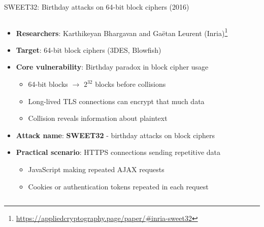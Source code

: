 \documentclass[aspectratio=169, lualatex, handout]{beamer}
\begin{document}
\begin{frame}{SWEET32: Birthday attacks on 64-bit block ciphers (2016)}
	\begin{columns}[c]
		\begin{column}{1\textwidth}
			\begin{itemize}
				\item \textbf{Researchers}: Karthikeyan Bhargavan and Gaëtan Leurent (Inria)\footnote{\url{https://appliedcryptography.page/paper/\#inria-sweet32}}
				\item \textbf{Target}: 64-bit block ciphers (3DES, Blowfish)
				\item \textbf{Core vulnerability}: Birthday paradox in block cipher usage
				      \begin{itemize}
					      \item 64-bit blocks $\rightarrow$ $2^{32}$ blocks before collisions
					      \item Long-lived TLS connections can encrypt that much data
					      \item Collision reveals information about plaintext
				      \end{itemize}
				\item \textbf{Attack name}: \textbf{SWEET32} - birthday attacks on block ciphers
				\item \textbf{Practical scenario}: HTTPS connections sending repetitive data
				      \begin{itemize}
					      \item JavaScript making repeated AJAX requests
					      \item Cookies or authentication tokens repeated in each request
				      \end{itemize}
			\end{itemize}
		\end{column}
	\end{columns}
\end{frame}
\end{document}
